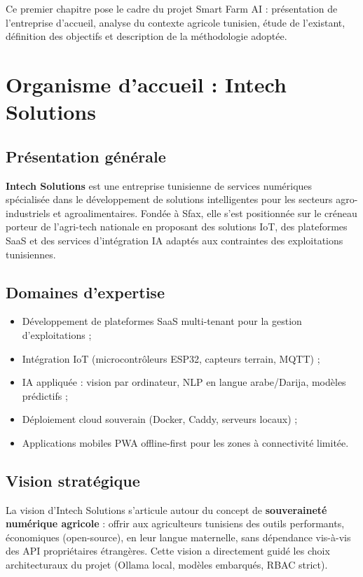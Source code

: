 Ce premier chapitre pose le cadre du projet Smart Farm AI : présentation
de l'entreprise d'accueil, analyse du contexte agricole tunisien, étude
de l'existant, définition des objectifs et description de la méthodologie
adoptée.

\section{Organisme d'accueil : Intech Solutions}

\subsection{Présentation générale}
\textbf{Intech Solutions} est une entreprise tunisienne de services numériques
spécialisée dans le développement de solutions intelligentes pour les secteurs
agro-industriels et agroalimentaires. Fondée à Sfax, elle s'est positionnée
sur le créneau porteur de l'agri-tech nationale en proposant des solutions
IoT, des plateformes SaaS et des services d'intégration IA adaptés aux
contraintes des exploitations tunisiennes.

\subsection{Domaines d'expertise}
\begin{itemize}
  \item Développement de plateformes SaaS multi-tenant pour la gestion d'exploitations ;
  \item Intégration IoT (microcontrôleurs ESP32, capteurs terrain, MQTT) ;
  \item IA appliquée : vision par ordinateur, NLP en langue arabe/Darija, modèles prédictifs ;
  \item Déploiement cloud souverain (Docker, Caddy, serveurs locaux) ;
  \item Applications mobiles PWA offline-first pour les zones à connectivité limitée.
\end{itemize}

\subsection{Vision stratégique}
La vision d'Intech Solutions s'articule autour du concept de
\textbf{souveraineté numérique agricole} : offrir aux agriculteurs tunisiens
des outils performants, économiques (open-source), en leur langue maternelle,
sans dépendance vis-à-vis des API propriétaires étrangères. Cette vision
a directement guidé les choix architecturaux du projet (Ollama local,
modèles embarqués, RBAC strict).

